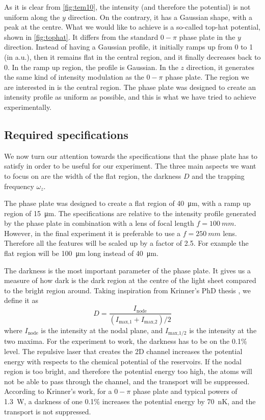 As it is clear from \cref{fig:tem10}, the intensity (and therefore the potential) is not uniform along the $y$ direction. On the contrary, it has a Gaussian shape, with a peak at the centre.
What we would like to achieve is a so-called top-hat potential, shown in \cref{fig:tophat}. It differs from the standard $0-\pi$ phase plate in the $y$ direction. Instead of having a Gaussian profile, it initially ramps up from 0 to 1 (in a.u.), then it remains flat in the central region, and it finally decreases back to 0. In the ramp up region, the profile is Gaussian. In the $z$ direction, it generates the same kind of intensity modulation as the $0-\pi$ phase plate. The region we are interested in is the central region. The phase plate was designed to create an intensity profile as uniform as possible, and this is what we have tried to achieve experimentally.

\subsection{Required specifications}
\label{sec:slm_specifications}
We now turn our attention towards the specifications that the phase plate has to satisfy in order to be useful for our experiment. The three main aspects we want to focus on are the width of the flat region, the darkness $D$ and the trapping frequency $\omega_z$.

The phase plate was designed to create a flat region of \SI{40}{\micro \meter}, with a ramp up region of \SI{15}{\micro\meter}. The specifications are relative to the intensity profile generated by the phase plate in combination with a lens of focal length $f=\SI{100}{mm}$. However, in the final experiment it is preferable to use a $f=\SI{250}{mm}$ lens. Therefore all the features will be scaled up by a factor of 2.5. For example the flat region will be \SI{100}{\micro\meter} long instead of \SI{40}{\micro\meter}.

The darkness is the most important parameter of the phase plate. It gives us a measure of how dark is the dark region at the centre of the light sheet compared to the bright region around. Taking inspiration from Krinner's PhD thesis \cite{krinner2015b}, we define it as
\begin{equation}
    \label{eq:darkness}
    D = \frac{I_\text{node}}{(I_\text{max,1} + I_\text{max,2}) / 2}
\end{equation}
where $I_\text{node}$ is the intensity at the nodal plane, and $I_\text{max,1/2}$ is the intensity at the two maxima. For the experiment to work, the darkness has to be on the 0.1\% level. The repulsive laser that creates the 2D channel increases the potential energy with respects to the chemical potential of the reservoirs. If the nodal region is too bright, and therefore the potential energy too high, the atoms will not be able to pass through the channel, and the transport will be suppressed. According to Krinner's work, for a $0-\pi$ phase plate and typical powers of \SI{1.3}{W}, a darkness of one 0.1\% increases the potential energy by \SI{70}{nK}, and the transport is not suppressed.

